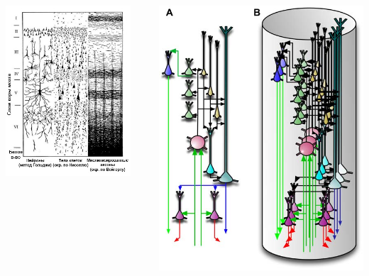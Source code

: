 \documentclass[default]{beamer}
\begin{document}
\begin{frame}
\begin{columns}
\begin{column}{0.4\textwidth}
				\includegraphics[width=0.9\textwidth]{phisio/column_layers_ru}
			\end{column}
			\begin{column}{0.3\textwidth}
				\includegraphics[width=\textwidth]{phisio/column}

\end{column}
\end{columns}
\end{frame}
\end{document}
